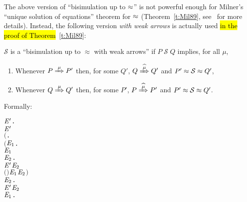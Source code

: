 The above version of ``bisimulation up to $\approx$'' 
is not powerful enough for Milner's ``unique solution of equations''
theorem for $\approx$ (Theorem~\ref{t:Mil89}, see~\cite{sangiorgi1992problem} for more details).
Instead, the following version \emph{with weak arrows} is
actually used \hl{in the proof of Theorem}~\ref{t:Mil89}:
\begin{definition}%
  \label{def:doubleweak}
$\mathcal{S}$ is a ``bisimulation up to $\approx$ with weak arrows'' if $P \;
  \mathcal{S} \; Q$ implies, for all $\mu$,
\begin{enumerate}
\item Whenever $P \Arr{\mu} P'$ then, for some $Q'$, $Q \Arcap{\mu} Q'$ and $P' \approx {\cal S} \approx Q'$,
\item Whenever $Q \Arr{\mu} Q'$ then, for some $P'$, $P \Arcap{\mu} P'$ and $P' \approx {\cal S} \approx Q'$.
\end{enumerate}
Formally:
\begin{alltt}
     \HOLTokenDefEquality{}
     \HOLSymConst{\HOLTokenForall{}} \ensuremath{\HOLBoundVar{E}\sp{\prime}}.
           \ensuremath{\HOLBoundVar{E}\sp{\prime}} \HOLSymConst{\HOLTokenImp{}}
         \ensuremath{(}\HOLSymConst{\HOLTokenForall{}}.
              \ensuremath{(}\HOLSymConst{\HOLTokenForall{}}\ensuremath{\HOLBoundVar{E}\sb{\mathrm{1}}}.
                    \HOLTokenWeakTransBegin{} \HOLTokenWeakTransEnd \ensuremath{\HOLBoundVar{E}\sb{\mathrm{1}}} \HOLSymConst{\HOLTokenImp{}}
                   \HOLSymConst{\HOLTokenExists{}}\ensuremath{\HOLBoundVar{E}\sb{\mathrm{2}}}.
                       \ensuremath{\HOLBoundVar{E}\sp{\prime}} \HOLTokenWeakTransBegin{} \HOLTokenWeakTransEnd \ensuremath{\HOLBoundVar{E}\sb{\mathrm{2}}} \HOLSymConst{\HOLTokenConj{}}
                       \ensuremath{(} \HOLSymConst{\HOLTokenRCompose{}}  \HOLSymConst{\HOLTokenRCompose{}} \ensuremath{)} \ensuremath{\HOLBoundVar{E}\sb{\mathrm{1}}} \ensuremath{\HOLBoundVar{E}\sb{\mathrm{2}}}\ensuremath{)} \HOLSymConst{\HOLTokenConj{}}
              \HOLSymConst{\HOLTokenForall{}}\ensuremath{\HOLBoundVar{E}\sb{\mathrm{2}}}.
                  \ensuremath{\HOLBoundVar{E}\sp{\prime}} \HOLTokenWeakTransBegin{} \HOLTokenWeakTransEnd \ensuremath{\HOLBoundVar{E}\sb{\mathrm{2}}} \HOLSymConst{\HOLTokenImp{}}
                  \HOLSymConst{\HOLTokenExists{}}\ensuremath{\HOLBoundVar{E}\sb{\mathrm{1}}}.

\end{alltt}
\end{definition}
